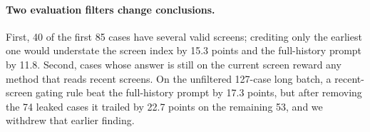 \paragraph{Two evaluation filters change conclusions.} First, 40 of the first 85 cases have several valid screens; crediting only the earliest one would understate the screen index by 15.3 points and the full-history prompt by 11.8. Second, cases whose answer is still on the current screen reward any method that reads recent screens. On the unfiltered 127-case long batch, a recent-screen gating rule beat the full-history prompt by 17.3 points, but after removing the 74 leaked cases it trailed by 22.7 points on the remaining 53, and we withdrew that earlier finding.

